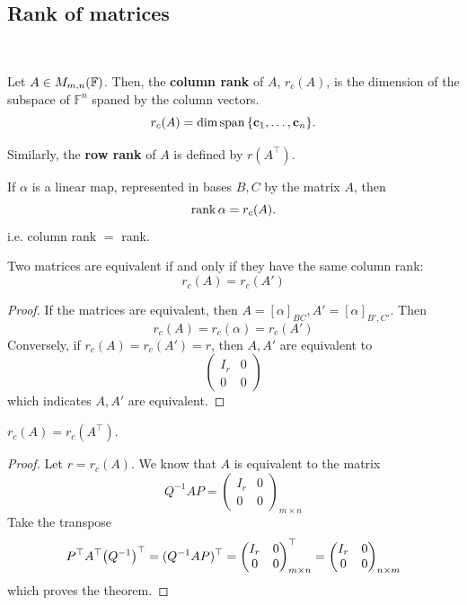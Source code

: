 \documentclass[a4paper]{article}
\begin{document}
\subsection{Rank of matrices}\ \vspace*{-1.5em}
\begin{definition}
	Let $ A \in M_{m,n}({\mathbb{F}}) $.
	Then, the \textbf{column rank} of $ A $, $ r_c(A) $, is the dimension of the subspace of $ \mathbb{F}^n $ spaned by the column vectors.
	\[
		r_c(A) = \dim \operatorname{span} \qty{{\bf c}_1, \dots, {\bf c}_n}.
	\]

    Similarly, the \textbf{row rank} of $A$ is defined by $ r(A^\top) $.
\end{definition}

\begin{remark}
	If $ \alpha $ is a linear map, represented in bases $ B, C $ by the matrix $ A $, then
	\[
		\rank \alpha = r_c(A). 
	\]
    i.e. column rank $=$ rank.
\end{remark}

\begin{proposition}
	Two matrices are equivalent if and only if they have the same column rank:
	\[
		r_c(A) = r_c(A')
	\]
\end{proposition}
\begin{proof}
	If the matrices are equivalent, then $ A = [\alpha]_{BC}, A' = [\alpha]_{B',C'} $.
	Then
	\[
		r_c(A) = r_c(\alpha) = r_c(A')
	\]
	Conversely, if $ r_c(A) = r_c(A') = r $, then $ A, A' $ are equivalent to
	\[
		\begin{pmatrix}
			I_r & 0 \\
			0   & 0
		\end{pmatrix}
	\]
	which indicates $ A, A' $ are equivalent.
\end{proof}

\begin{theorem}
    $ r_c(A) = r_c(A^\top) $. 
\end{theorem}
\begin{proof}
    Let $ r = r_c(A) $. We know that $A$ is equivalent to the matrix 
    \[
        Q^{-1}AP = \begin{pmatrix}
			I_r & 0 \\
			0   & 0
		\end{pmatrix}_{m\times n}
    \]
    Take the transpose
    \[
		P^\top A^\top \qty(Q^{-1})^\top = (Q^{-1}AP)^\top = \begin{pmatrix}
			I_r & 0 \\
			0   & 0
		\end{pmatrix}_{m \times n}^\top = \begin{pmatrix}
			I_r & 0 \\
			0   & 0
		\end{pmatrix}_{n \times m}
	\]
    which proves the theorem. 
\end{proof}
\end{document}
